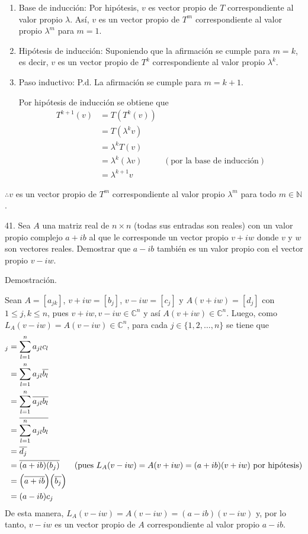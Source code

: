 \documentclass[fleqn]{article}
\begin{document}
    \begin{enumerate}
        \item Base de inducción: Por hipótesis, $ v $ es vector propio de $ T $ correspondiente al valor propio $ \lambda $. Así, $ v $ es un vector propio de $ T^m $ correspondiente al valor propio $ \lambda^m $ para $ m = 1 $.
        \item Hipótesis de inducción: Suponiendo que la afirmación se cumple para $ m = k $, es decir, $ v $ es un vector propio de $ T^k $ correspondiente al valor propio $ \lambda^k $.
        \item Paso inductivo: P.d. La afirmación se cumple para $ m = k + 1 $.
        
        Por hipótesis de inducción se obtiene que 
        \begin{align*}
            T^{k + 1} (v) &= T(T^k (v)) \\
            &= T(\lambda^k v) \\
            &= \lambda^k T(v) \\
            &= \lambda^k (\lambda v) & (\text{por la base de inducción}) \\
            &= \lambda^{k+1} v 
        \end{align*}
    \end{enumerate}

    $ \therefore v $ es un vector propio de $ T^m $ correspondiente al valor propio $ \lambda^m $ para todo $ m \in \mathbb{N} $.

    41. Sea $ A $ una matriz real de $ n \times n $ (todas sus entradas son reales) con un valor propio complejo $ a + ib $ al que le corresponde un vector propio $ v + iw $ donde $ v $ y $ w $ son vectores reales. Demostrar que $ a - ib $ también es un valor propio con el vector propio $ v - iw $.

    Demostración.

    Sean $ A = [a_{jk}] $, $ v + iw = [b_{j}] $, $ v - iw = [c_{j}] $ y $ A(v + iw) = [d_{j}] $ con $ 1 \leq j,k \leq n $, pues $ v + iw, v - iw \in \mathbb{C}^n $ y así $ A(v + iw) \in \mathbb{C}^n $. Luego, como $ L_A (v - iw) = A(v - iw) \in \mathbb{C}^n $, para cada $ j \in \{ 1, 2, \dots , n \} $ se tiene que
    \begin{align*}
        [A(v - iw)]_j &= \sum_{l = 1}^{n} a_{jl} c_{l} \\
        &= \sum_{l = 1}^{n} a_{jl} \overline{b_{l}} \\
        &= \sum_{l = 1}^{n} \overline{a_{jl} b_{l}} \\
        &= \overline{\sum_{l = 1}^{n} a_{jl} b_{l}} \\
        &= \overline{d_{j}} \\
        &= \overline{(a + ib)(b_j)} & \left( \text{pues } L_A (v - iw) = A(v + iw) = (a + ib)(v + iw) \text{ por hipótesis} \right) \\
        &= \Bigl( \overline{a + ib} \Bigr) \Bigl( \overline{b_j} \Bigr) \\
        &= (a - ib) c_j
    \end{align*}
    De esta manera, $ L_A (v - iw) = A(v - iw) = (a - ib)(v - iw) $ y, por lo tanto, $ v - iw $ es un vector propio de $ A $ correspondiente al valor propio $ a - ib $.
\end{document}
